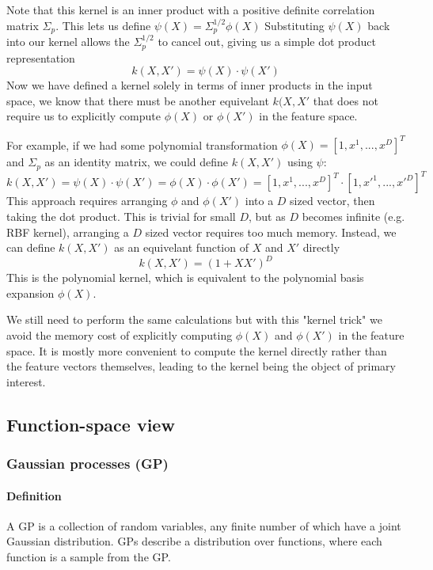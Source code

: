 \documentclass[10pt]{article}
\begin{document}
Note that this kernel is an inner product with a positive definite correlation matrix $\Sigma_p$. This lets us define $\psi(X) = \Sigma_p^{1/2}\phi(X)$
 Substituting $\psi(X)$ back into our kernel allows the $\Sigma_p^{1/2}$ to cancel out, giving us a simple dot product representation  
\begin{equation*}
    k(X,X') = \psi(X) \cdot \psi(X')
\end{equation*}
Now we have defined a kernel solely in terms of inner products in the input space, we know that there must be another equivelant $k(X, X'$ that does not require us to explicitly compute $\phi(X)$ or $\phi(X')$ in the feature space.

For example, if we had some polynomial transformation $\phi(X) = [1, x^1, ..., x^D]^T$ and $\Sigma_p$ as an identity matrix, we could define $k(X,X')$ using $\psi$:
\begin{equation*}
    k(X,X') = \psi(X) \cdot \psi(X') = \phi(X) \cdot \phi(X') = [1, x^1, ..., x^D]^T \cdot [1, x'^1, ..., x'^D]^T
\end{equation*}
This approach requires arranging $\phi$ and $\phi(X')$ into a $D$ sized vector, then taking the dot product. This is trivial for small $D$, but as $D$ becomes infinite (e.g. RBF kernel), arranging a $D$ sized vector requires too much memory. Instead, we can define $k(X,X')$ as an equivelant function of $X$ and $X'$ directly
\begin{equation*}
    k(X,X') = (1 + XX')^D
\end{equation*}
This is the polynomial kernel, which is equivalent to the polynomial basis expansion $\phi(X)$. 

We still need to perform the same calculations but with this "kernel trick" we avoid the memory cost of explicitly computing $\phi(X)$ and $\phi(X')$ in the feature space. It is mostly more convenient to compute the kernel directly rather than the feature vectors themselves, leading to the kernel being the object of primary interest.


\subsection{Function-space view \cite{gp-ml}}

\subsubsection{Gaussian processes (GP)}
\paragraph{Definition}
A GP is a collection of random variables, any finite number of which have a joint Gaussian distribution. GPs describe a distribution over functions, where each function is a sample from the GP.
\end{document}
